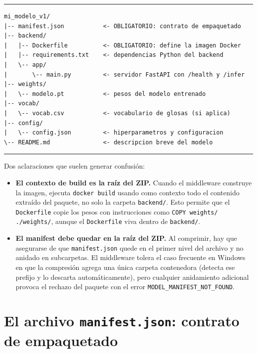 \documentclass[12pt,a4paper]{article}
\begin{document}
\begin{center}
\begin{minipage}{0.9\textwidth}
\hrule
\vspace{0.06cm}
\small
\begin{Verbatim}[baselinestretch=0.85]
mi_modelo_v1/
|-- manifest.json           <- OBLIGATORIO: contrato de empaquetado
|-- backend/
|   |-- Dockerfile          <- OBLIGATORIO: define la imagen Docker
|   |-- requirements.txt    <- dependencias Python del backend
|   \-- app/
|       \-- main.py         <- servidor FastAPI con /health y /infer
|-- weights/
|   \-- modelo.pt           <- pesos del modelo entrenado
|-- vocab/
|   \-- vocab.csv           <- vocabulario de glosas (si aplica)
|-- config/
|   \-- config.json         <- hiperparametros y configuracion
\-- README.md               <- descripcion breve del modelo
\end{Verbatim}
\vspace{0.03cm}
\hrule
{}
\end{minipage}
\end{center}

Dos aclaraciones que suelen generar confusión:

\begin{itemize}[topsep=2pt]
    \item \textbf{El contexto de build es la raíz del ZIP.} Cuando el middleware construye la imagen, ejecuta \texttt{docker build} usando como contexto todo el contenido extraído del paquete, no solo la carpeta \texttt{backend/}. Esto permite que el \texttt{Dockerfile} copie los pesos con instrucciones como \texttt{COPY weights/ ./weights/}, aunque el \texttt{Dockerfile} viva dentro de \texttt{backend/}.
    \item \textbf{El manifest debe quedar en la raíz del ZIP.} Al comprimir, hay que asegurarse de que \texttt{manifest.json} quede en el primer nivel del archivo y no anidado en subcarpetas. El middleware tolera el caso frecuente en Windows en que la compresión agrega una única carpeta contenedora (detecta ese prefijo y lo descarta automáticamente), pero cualquier anidamiento adicional provoca el rechazo del paquete con el error \texttt{MODEL\_MANIFEST\_NOT\_FOUND}.
\end{itemize}

\section{El archivo \texttt{manifest.json}: contrato de empaquetado}
\end{document}
